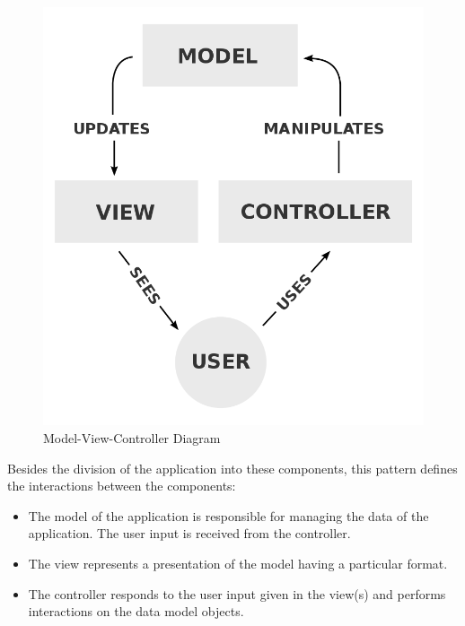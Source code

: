 \documentclass[12pt,a4paper,twoside]{report}
\begin{document}
\begin{figure}
	\centering
	\includegraphics[scale=0.2]{img/MVCDiag.png}
	\caption{Model-View-Controller Diagram}
\end{figure}

Besides the division of the application into these components, this pattern defines the interactions between the components:

\begin{itemize}
	\item The model of the application is responsible for managing the data of the application. The user input is received from the controller.
	\item The view represents a presentation of the model having a particular format.
	\item The controller responds to the user input given in the view(s) and performs interactions on the data model objects.
\end{itemize}
\end{document}
